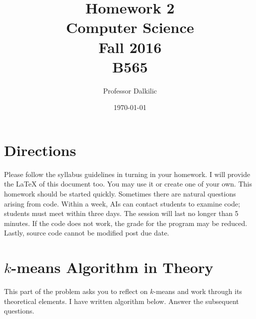 \documentclass{article}
\begin{document}
\title{Homework 2\\ Computer Science \\ Fall 2016\\ B565}         %
\author{Professor Dalkilic}        %
\date{\today}          %
\maketitle
\makeatother     %
\pagestyle{plain}
\section*{Directions}
Please follow the syllabus guidelines in turning in your homework.  I will provide the \LaTeX{} of this document too.  You may use it or create one of your own.  This homework should be started quickly.   Sometimes there are natural questions arising from code.  Within a week, AIs can contact students to examine code; students must meet within three days.  The session will last no longer than 5 minutes.  If the code does not work, the grade for the program may be reduced.  Lastly, source code cannot be modified post due date.

\section*{$k$-means Algorithm in Theory}
This part of the problem asks you to reflect on $k$-means and work through its theoretical elements.  I have written algorithm below.   Answer the subsequent questions.
\end{document}
